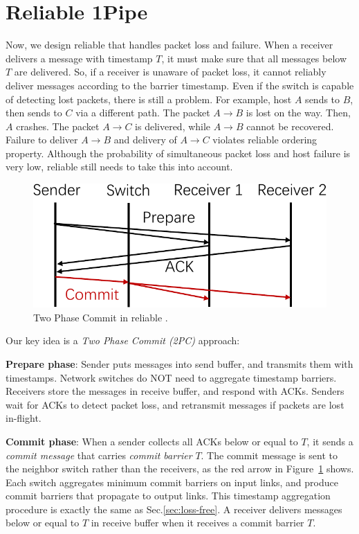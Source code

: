 \section{Reliable 1Pipe}
\label{sec:reliable}

Now, we design reliable \sys{} that handles packet loss and failure.
When a receiver delivers a message with timestamp $T$, it must make sure that all messages below $T$ are delivered.
So, if a receiver is unaware of packet loss, it cannot reliably deliver messages according to the barrier timestamp.
Even if the switch is capable of detecting lost packets, there is still a problem. %
For example, host $A$ sends to $B$, then sends to $C$ via a different path. The packet $A \rightarrow B$ is lost on the way. Then, $A$ crashes. The packet $A \rightarrow C$ is delivered, while $A \rightarrow B$ cannot be recovered. Failure to deliver $A \rightarrow B$ and delivery of $A \rightarrow C$ violates reliable ordering property.
Although the probability of simultaneous packet loss and host failure is very low, reliable \sys{} still needs to take this into account.


\begin{figure}[t]
\centering
	\includegraphics[width=.3\textwidth]{images/2PC.pdf}
	\caption{Two Phase Commit in reliable \sys{}.}
	\label{fig:2PC}
\end{figure}

Our key idea is a \emph{Two Phase Commit (2PC)} approach:

\begin{ecompact}
\item \textbf{Prepare phase}: Sender puts messages into send buffer, and transmits them with timestamps. Network switches do NOT need to aggregate timestamp barriers. Receivers store the messages in receive buffer, and respond with ACKs. Senders wait for ACKs to detect packet loss, and retransmit messages if packets are lost in-flight.
\item \textbf{Commit phase}: When a sender collects all ACKs below or equal to $T$, it sends a \emph{commit message} that carries \emph{commit barrier} $T$. The commit message is sent to the neighbor switch rather than the receivers, as the red arrow in Figure~\ref{fig:2PC} shows. Each switch aggregates minimum commit barriers on input links, and produce commit barriers that propagate to output links. This timestamp aggregation procedure is exactly the same as Sec.\ref{sec:loss-free}. A receiver delivers messages below or equal to $T$ in receive buffer when it receives a commit barrier $T$.
\end{ecompact}



